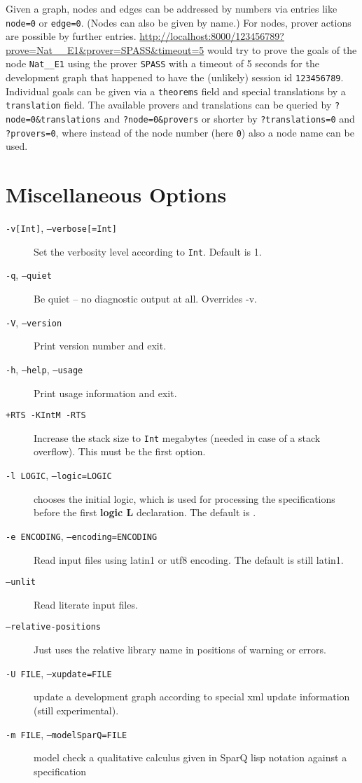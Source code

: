 \documentclass{article}
\begin{document}
Given a graph, nodes and edges can be addressed by numbers via entries like
\texttt{node=0} or \texttt{edge=0}. (Nodes can also be given by name.)  For
nodes, prover actions are possible by further
entries. \url{http://localhost:8000/123456789?prove=Nat\_\_E1\&prover=SPASS\&timeout=5}
would try to prove the goals of the node \texttt{Nat\_\_E1} using the prover
\texttt{SPASS} with a timeout of 5 seconds for the development graph that
happened to have the (unlikely) session id \texttt{123456789}. Individual
goals can be given via a \texttt{theorems} field and special translations by a
\texttt{translation} field. The available provers and translations can be
queried by \texttt{?node=0\&translations} and \texttt{?node=0\&provers} or
shorter by \texttt{?translations=0} and \texttt{?provers=0}, where instead of
the node number (here \texttt{0}) also a node name can be used.

\section{Miscellaneous Options}

\begin{description}
\item[\texttt{-v[Int]}, \texttt{--verbose[=Int]}]
Set the verbosity level according to \texttt{Int}. Default is 1.
\item[\texttt{-q}, \texttt{--quiet}]
Be quiet -- no diagnostic output at all. Overrides -v.
\item[\texttt{-V}, \texttt{--version}] Print version number and exit.
\item[\texttt{-h}, \texttt{--help}, \texttt{--usage}]
Print usage information and exit.
\item[\texttt{+RTS -KIntM -RTS}] Increase the stack size to
 \texttt{Int} megabytes (needed in case of a stack overflow).
This must be the first option.
\item[\texttt{-l LOGIC}, \texttt{--logic=LOGIC}] chooses the initial logic, which is used for processing the specifications before the first \textbf{logic L}
declaration. The default is \CASL.
\item[\texttt{-e ENCODING}, \texttt{--encoding=ENCODING}] Read input files using latin1 or utf8 encoding. The default is still latin1.
\item[\texttt{--unlit}] Read literate input files.
\item[\texttt{--relative-positions}] Just uses the relative library name in positions of warning or errors.
\item[\texttt{-U FILE}, \texttt{--xupdate=FILE}] update a development graph according to special xml update information (still experimental).
\item[\texttt{-m FILE}, \texttt{--modelSparQ=FILE}] model check a qualitative calculus given in SparQ lisp notation \cite{SparQ06} against a \CASL specification
\end{description}
\end{document}
